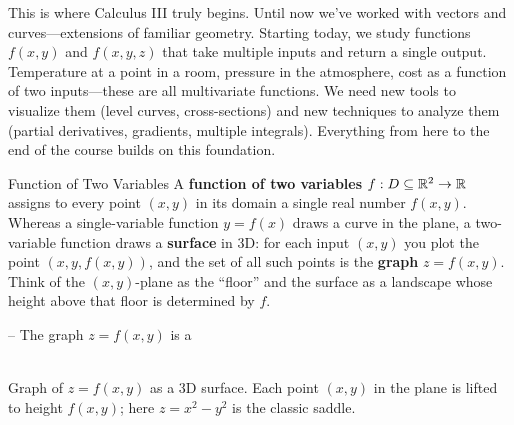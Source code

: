 \documentclass[11pt]{article}
\begin{document}

\begin{background}
This is where Calculus III truly begins. Until now we've worked with vectors and curves---extensions of familiar geometry. Starting today, we study functions $f(x,y)$ and $f(x,y,z)$ that take multiple inputs and return a single output. Temperature at a point in a room, pressure in the atmosphere, cost as a function of two inputs---these are all multivariate functions. We need new tools to visualize them (level curves, cross-sections) and new techniques to analyze them (partial derivatives, gradients, multiple integrals). Everything from here to the end of the course builds on this foundation.
\end{background}


\begin{defbox}{Function of Two Variables}
A \textbf{function of two variables} $f:D\subseteq\mathbb{R}^2\to\mathbb{R}$ assigns to every point $(x,y)$ in its domain a single real number $f(x,y)$. Whereas a single-variable function $y=f(x)$ draws a curve in the plane, a two-variable function draws a \textbf{surface} in 3D: for each input $(x,y)$ you plot the point $(x,y,f(x,y))$, and the set of all such points is the \textbf{graph} $z=f(x,y)$. Think of the $(x,y)$-plane as the ``floor'' and the surface as a landscape whose height above that floor is determined by $f$.

-- The graph $z = f(x,y)$ is a 
\end{defbox}

\begin{center}
\\
{\small Graph of $z=f(x,y)$ as a 3D surface. Each point $(x,y)$ in the plane is lifted to height $f(x,y)$; here $z=x^2-y^2$ is the classic saddle.}
\end{center}
\end{document}

